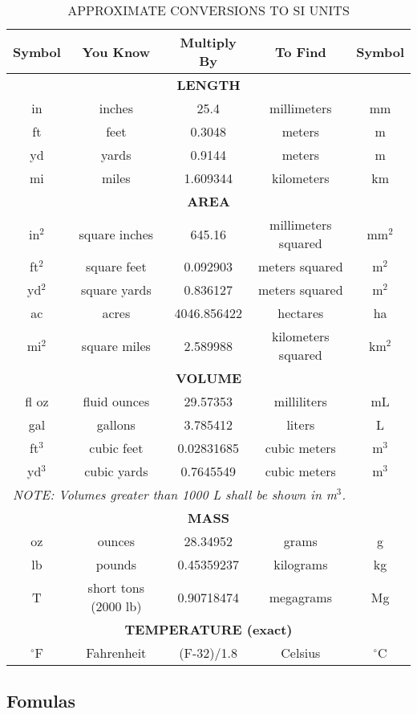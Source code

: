 \documentclass[11pt]{article}
\begin{document}
  \begin{table}[h!]
  \centering
  \caption{APPROXIMATE CONVERSIONS TO SI UNITS}
  \begin{tabular}{|c|c|c|c|c|}
  \hline
  \textbf{Symbol} & \textbf{You Know} & \textbf{Multiply By} & \textbf{To Find} & \textbf{Symbol} \\
  \hline
  \multicolumn{5}{|c|}{\textbf{LENGTH}} \\
  \hline
  in & inches & 25.4 & millimeters & mm \\
  ft & feet & 0.3048 & meters & m \\
  yd & yards & 0.9144 & meters & m \\
  mi & miles & 1.609344 & kilometers & km \\
  \hline
  \multicolumn{5}{|c|}{\textbf{AREA}} \\
  \hline
  in\(^2\) & square inches & 645.16 & millimeters squared & mm\(^2\) \\
  ft\(^2\) & square feet & 0.092903 & meters squared & m\(^2\) \\
  yd\(^2\) & square yards & 0.836127 & meters squared & m\(^2\) \\
  ac & acres & 4046.856422 & hectares & ha \\
  mi\(^2\) & square miles & 2.589988 & kilometers squared & km\(^2\) \\
  \hline
  \multicolumn{5}{|c|}{\textbf{VOLUME}} \\
  \hline
  fl oz & fluid ounces & 29.57353 & milliliters & mL \\
  gal & gallons & 3.785412 & liters & L \\
  ft\(^3\) & cubic feet & 0.02831685 & cubic meters & m\(^3\) \\
  yd\(^3\) & cubic yards & 0.7645549 & cubic meters & m\(^3\) \\
  \multicolumn{5}{|l|}{\textit{NOTE: Volumes greater than 1000 L shall be shown in m\(^3\).}} \\
  \hline
  \multicolumn{5}{|c|}{\textbf{MASS}} \\
  \hline
  oz & ounces & 28.34952 & grams & g \\
  lb & pounds & 0.45359237 & kilograms & kg \\
  T & short tons (2000 lb) & 0.90718474 & megagrams & Mg \\
  \hline
  \multicolumn{5}{|c|}{\textbf{TEMPERATURE (exact)}} \\
  \hline
  \(^{\circ}\)F & Fahrenheit & (F-32)/1.8 & Celsius & \(^{\circ}\)C \\
  \hline
  \end{tabular}
  \label{tab:conversion_table}
  \end{table}
  
  \subsection{Fomulas}




\end{document}
